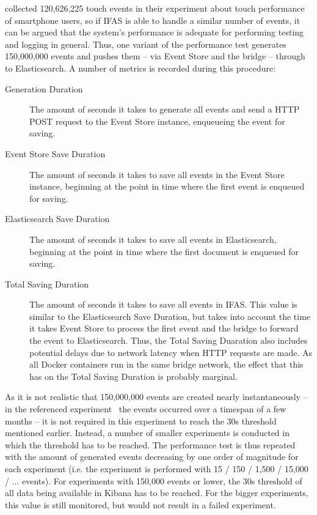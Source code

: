 \citet{Henze2011} collected 120,626,225 touch events in their experiment about touch performance of smartphone users, so if \ac{IFAS} is able to handle a similar number of events, it can be argued that the system's performance is adequate for performing testing and logging in general.
Thus, one variant of the performance test generates 150,000,000 events and pushes them -- via Event Store and the bridge -- through to Elasticsearch.
A number of metrics is recorded during this procedure:

\begin{description}
\item[Generation Duration] The amount of seconds it takes to generate all events and send a \ac{HTTP} POST request to the Event Store instance, enqueueing the event for saving.
\item[Event Store Save Duration] The amount of seconds it takes to save all events in the Event Store instance, beginning at the point in time where the first event is enqueued for saving.
\item[Elasticsearch Save Duration] The amount of seconds it takes to save all events in Elasticsearch, beginning at the point in time where the first document is enqueued for saving.
\item[Total Saving Duration] The amount of seconds it takes to save all events in \ac{IFAS}.
This value is similar to the Elasticsearch Save Duration, but takes into account the time it takes Event Store to process the first event and the bridge to forward the event to Elasticsearch.
Thus, the Total Saving Duaration also includes potential delays due to network latency when \ac{HTTP} requests are made.
As all Docker containers run in the same bridge network, the effect that this has on the Total Saving Duration is probably marginal.
\end{description}

As it is not realistic that 150,000,000 events are created nearly instantaneously -- in the referenced experiment~\cite{Henze2011} the events occurred over a timespan of a few months -- it is not required in this experiment to reach the 30s threshold mentioned earlier.
Instead, a number of smaller experiments is conducted in which the threshold has to be reached.
The performance test is thus repeated with the amount of generated events decreasing by one order of magnitude for each experiment (i.e. the experiment is performed with 15 / 150 / 1,500 / 15,000 / ... events).
For experiments with 150,000 events or lower, the 30s threshold of all data being available in Kibana has to be reached.
For the bigger experiments, this value is still monitored, but would not result in a failed experiment.

